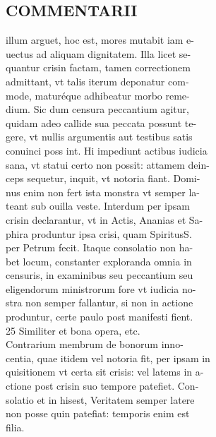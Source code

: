 \documentclass{article}
\begin{document}
\begin{pages}
\section*{COMMENTARII \\
                }illum arguet, hoc est, mores mutabit iam e- \\
                uectus ad aliquam dignitatem. Illa licet se- \\
                quantur crisin factam, tamen correctionem \\
                admittant, vt talis iterum deponatur com- \\
                mode, maturéque adhibeatur morbo reme- \\
                dium. Sic dum censura peccantium agitur, \\
                quidam adeo callide sua peccata possunt te- \\
                gere, vt nullis argumentis aut testibus satis \\
                conuinci poss int. Hi impediunt actibus iudicia \\
                sana, vt statui certo non possit: attamem dein- \\
                ceps sequetur, inquit, vt notoria fiant. Domi- \\
                nus enim non fert ista monstra vt semper la- \\
                teant sub ouilla veste. Interdum per ipsam \\
                crisin declarantur, vt in Actis, Ananias et Sa- \\
                phira produntur ipsa crisi, quam SpiritusS. \\
                per Petrum fecit. Itaque consolatio non ha- \\
                bet locum, constanter exploranda omnia in \\
                censuris, in examinibus seu peccantium seu \\
                eligendorum ministrorum fore vt iudicia no- \\
                stra non semper fallantur, si non in actione \\
                produntur, certe paulo post manifesti fient. \\
                25 Similiter et bona opera, etc. \\
                Contrarium membrum de bonorum inno- \\
                centia, quae itidem vel notoria fit, per ipsam in \\
                quisitionem vt certa sit crisis: vel latems in a- \\
                ctione post crisin suo tempore patefiet. Con- \\
                solatio et in hisest, Veritatem semper latere \\
                non posse quin patefiat: temporis enim est \\
                filia. \\
                

\end{pages}
\end{document}
